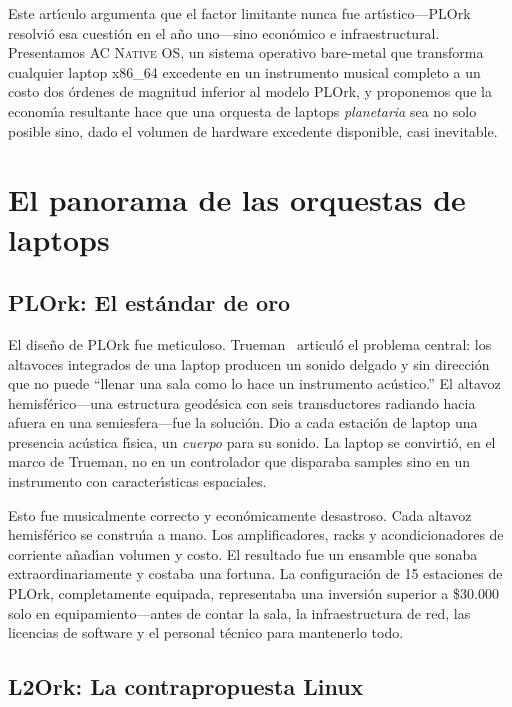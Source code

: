 \documentclass[10pt,letterpaper,twocolumn]{article}
\newcommand{\acos}{\textsc{AC Native OS}}
\begin{document}
Este art\'{\i}culo argumenta que el factor limitante nunca fue art\'{\i}stico---PLOrk resolvi\'{o} esa cuesti\'{o}n en el a\~{n}o uno---sino econ\'{o}mico e infraestructural. Presentamos \acos{}, un sistema operativo bare-metal que transforma cualquier laptop x86\_64 excedente en un instrumento musical completo a un costo dos \'{o}rdenes de magnitud inferior al modelo PLOrk, y proponemos que la econom\'{\i}a resultante hace que una orquesta de laptops \emph{planetaria} sea no solo posible sino, dado el volumen de hardware excedente disponible, casi inevitable.


\section{El panorama de las orquestas de laptops}
\label{sec:landscape}

\subsection{PLOrk: El est\'{a}ndar de oro}

El dise\~{n}o de PLOrk fue meticuloso. Trueman~\citep{trueman2007why} articul\'{o} el problema central: los altavoces integrados de una laptop producen un sonido delgado y sin direcci\'{o}n que no puede ``llenar una sala como lo hace un instrumento ac\'{u}stico.'' El altavoz hemisf\'{e}rico---una estructura geod\'{e}sica con seis transductores radiando hacia afuera en una semiesfera---fue la soluci\'{o}n. Dio a cada estaci\'{o}n de laptop una presencia ac\'{u}stica f\'{\i}sica, un \emph{cuerpo} para su sonido. La laptop se convirti\'{o}, en el marco de Trueman, no en un controlador que disparaba samples sino en un instrumento con caracter\'{\i}sticas espaciales.

Esto fue musicalmente correcto y econ\'{o}micamente desastroso. Cada altavoz hemisf\'{e}rico se constru\'{\i}a a mano. Los amplificadores, racks y acondicionadores de corriente a\~{n}ad\'{\i}an volumen y costo. El resultado fue un ensamble que sonaba extraordinariamente y costaba una fortuna. La configuraci\'{o}n de 15 estaciones de PLOrk, completamente equipada, representaba una inversi\'{o}n superior a \$30.000 solo en equipamiento---antes de contar la sala, la infraestructura de red, las licencias de software y el personal t\'{e}cnico para mantenerlo todo.

\subsection{L2Ork: La contrapropuesta Linux}
\end{document}
